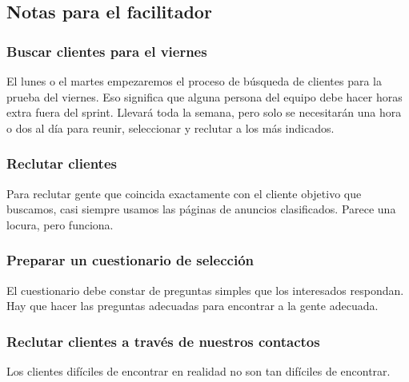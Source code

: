 \documentclass[10pt]{article}
\begin{document}
\begin{multicols}{2}
\subsection*{Notas para el facilitador}
\subsubsection*{Buscar clientes para el viernes}
El lunes o el martes empezaremos el proceso de búsqueda de clientes para la prueba del viernes. Eso significa que alguna persona del equipo debe hacer horas extra fuera del sprint. Llevará toda la semana, pero solo se necesitarán una hora o dos al día para reunir, seleccionar y reclutar a los más indicados. 
\subsubsection*{Reclutar clientes}
Para reclutar gente que coincida exactamente con el cliente objetivo que buscamos, casi siempre usamos las páginas de anuncios clasificados. Parece una locura, pero funciona.
\subsubsection*{Preparar un cuestionario de selección}
El cuestionario debe constar de preguntas simples que los interesados respondan. Hay que hacer las preguntas adecuadas para encontrar a la gente adecuada.
\subsubsection*{Reclutar clientes a través de nuestros contactos}
Los clientes difíciles de encontrar en realidad no son tan difíciles de encontrar.
\end{multicols}
\end{document}

